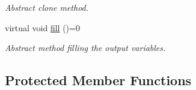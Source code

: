 \begin{DoxyCompactItemize}
\begin{DoxyCompactList}\small\item\em Abstract clone method. \end{DoxyCompactList}\item 
\hypertarget{a00314_a26aa352398b544f0a8d0e91acd02a84c}{virtual void \hyperlink{a00314_a26aa352398b544f0a8d0e91acd02a84c}{fill} ()=0}\label{a00314_a26aa352398b544f0a8d0e91acd02a84c}

\begin{DoxyCompactList}\small\item\em Abstract method filling the output variables. \end{DoxyCompactList}\end{DoxyCompactItemize}
\subsection*{Protected Member Functions}
